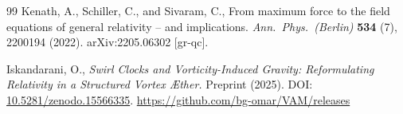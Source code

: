 \documentclass[a4paper,12pt]{article}
\begin{document}
\begin{thebibliography}{99}
Kenath, A., Schiller, C., and Sivaram, C.,
\newblock From maximum force to the field equations of general relativity -- and implications.
\newblock \textit{Ann.\ Phys.\ (Berlin)} \textbf{534} (7), 2200194 (2022).
\newblock arXiv:2205.06302 [gr-qc].

Iskandarani, O.,
\newblock \textit{Swirl Clocks and Vorticity-Induced Gravity: Reformulating Relativity in a Structured Vortex \AE ther.}
\newblock Preprint (2025).
\newblock DOI: \href{https://doi.org/10.5281/zenodo.15566335}{10.5281/zenodo.15566335}.
\newblock \url{https://github.com/bg-omar/VAM/releases}

\end{thebibliography}
\end{document}
